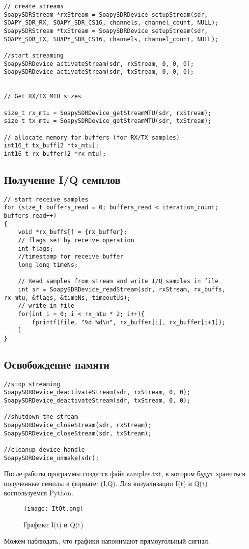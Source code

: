 \begin{lstlisting}
// create streams
SoapySDRStream *rxStream = SoapySDRDevice_setupStream(sdr, SOAPY_SDR_RX, SOAPY_SDR_CS16, channels, channel_count, NULL);
SoapySDRStream *txStream = SoapySDRDevice_setupStream(sdr, SOAPY_SDR_TX, SOAPY_SDR_CS16, channels, channel_count, NULL);

//start streaming
SoapySDRDevice_activateStream(sdr, rxStream, 0, 0, 0); 
SoapySDRDevice_activateStream(sdr, txStream, 0, 0, 0);


// Get RX/TX MTU sizes

size_t rx_mtu = SoapySDRDevice_getStreamMTU(sdr, rxStream);
size_t tx_mtu = SoapySDRDevice_getStreamMTU(sdr, txStream);

// allocate memory for buffers (for RX/TX samples)
int16_t tx_buff[2 *tx_mtu];
int16_t rx_buffer[2 *rx_mtu];
\end{lstlisting}


\subsection*{\textbf{Получение I/Q семплов}}

\begin{lstlisting}
// start receive samples
for (size_t buffers_read = 0; buffers_read < iteration_count; buffers_read++)
{
    void *rx_buffs[] = {rx_buffer};
    // flags set by receive operation
    int flags;    
    //timestamp for receive buffer   
    long long timeNs; 
    
    // Read samples from stream and write I/Q samples in file
    int sr = SoapySDRDevice_readStream(sdr, rxStream, rx_buffs, rx_mtu, &flags, &timeNs, timeoutUs);
    // write in file
    for(int i = 0; i < rx_mtu * 2; i++){
        fprintf(file, "%d %d\n", rx_buffer[i], rx_buffer[i+1]);
    }
}
\end{lstlisting}

\subsection*{\textbf{Освобождение памяти}}

\begin{lstlisting}
//stop streaming
SoapySDRDevice_deactivateStream(sdr, rxStream, 0, 0);
SoapySDRDevice_deactivateStream(sdr, txStream, 0, 0);

//shutdown the stream
SoapySDRDevice_closeStream(sdr, rxStream);
SoapySDRDevice_closeStream(sdr, txStream);

//cleanup device handle
SoapySDRDevice_unmake(sdr);
\end{lstlisting}

После работы программы создатся файл samples.txt, в котором будут храниться полученные семплы в формате: (I,Q). Для визуализации
I(t) и Q(t) воспользуемся Python.

\begin{figure}[H]
    \centering
    \texttt{[image: ItQt.png]}
    \caption{Графики I(t) и Q(t)}
\end{figure}

Можем наблюдать, что графики напонимают прямоугольный сигнал.

\endinput
